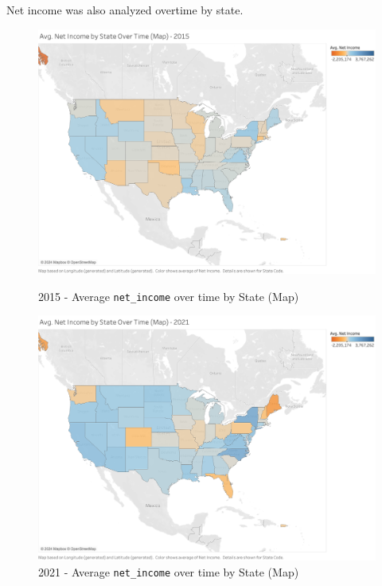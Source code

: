 \documentclass{article}
\theoremstyle{mytheoremstyle}
\theoremstyle{mytheoremstyle}
\theoremstyle{myproblemstyle}
\begin{document}
\pagebreak
Net income was also analyzed overtime by state. 
\begin{figure}[!h]
\centering
\begin{minipage}{\linewidth}
    \centering %
    \includegraphics[width=0.75\linewidth]{Images/Avg. Net Income by State Over Time (Map).png}
    \caption{2015 - Average \texttt{net\_income} over time by State (Map)}
    \label{fig:net_income_map}
\end{minipage}\vspace{1cm} %

\begin{minipage}{\linewidth}
    \centering %
    \includegraphics[width=0.75\linewidth]{Images/Avg. Net Income by State Over Time (Map)2021.png}
    \caption{2021 - Average \texttt{net\_income} over time by State (Map)}
    \label{fig:net_income_map_2021}
\end{minipage}
\end{figure}

\pagebreak
\end{document}
